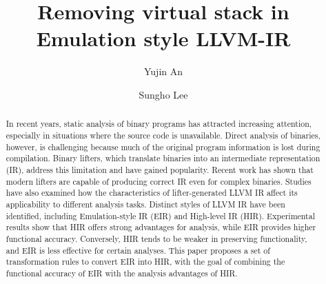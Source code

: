 \documentclass[sigplan,10pt]{acmart}
\begin{document}
\title{Removing virtual stack in Emulation style LLVM-IR}

\author{Yujin An}

\author{Sungho Lee}

\begin{abstract}
In recent years, static analysis of binary programs has attracted increasing
attention, especially in situations where the source code is unavailable.
Direct analysis of binaries, however, is challenging because much of the
original program information is lost during compilation. Binary lifters, which
translate binaries into an intermediate representation (IR), address this
limitation and have gained popularity. Recent work has shown that modern
lifters are capable of producing correct IR even for complex binaries.
Studies have also examined how the characteristics of lifter-generated LLVM IR
affect its applicability to different analysis tasks. Distinct styles of LLVM
IR have been identified, including Emulation-style IR (EIR) and High-level IR
(HIR). Experimental results show that HIR offers strong advantages for
analysis, while EIR provides higher functional accuracy. Conversely, HIR tends
to be weaker in preserving functionality, and EIR is less effective for certain
analyses.
This paper proposes a set of transformation rules to convert EIR into HIR, with
the goal of combining the functional accuracy of EIR with the analysis
advantages of HIR.
\end{abstract}

\maketitle








\end{document}
